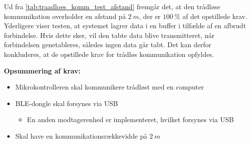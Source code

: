 \noindent
Ud fra \autoref{tab:traadloes_komm_test_afstand} fremgår det, at den trådløse kommunikation overholder en afstand på $2~m$, der er $100~\%$ af det opstillede krav. Yderligere viser testen, at systemet lagrer data i en buffer i tilfælde af en afbrudt forbindelse. Hvis dette sker, vil den tabte data blive transmitteret, når forbindelsen genetableres, således ingen data går tabt. Det kan derfor konkluderes, at de opstillede krav for trådløs kommunikation opfyldes.
\vspace{3mm}

\textbf{Opsummering af krav:}
\begin{itemize}
\item[\text{\sffamily \checkmark}] Mikrokontrolleren skal kommunikere trådløst med en computer
\item[\text{\sffamily $\div$}] BLE-dongle skal forsynes via USB
\begin{itemize}
\item[\text{\sffamily \checkmark}] En anden modtagerenhed er implementeret, hvilket forsynes via USB
\end{itemize}
\item[\text{\sffamily \checkmark}] Skal have en kommunikationsrækkevidde på $2~m$
\end{itemize}